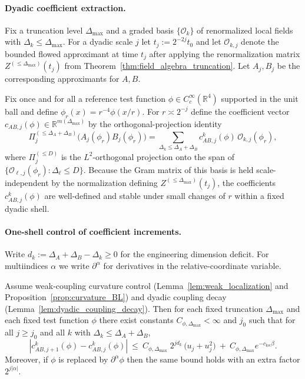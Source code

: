 \paragraph{Dyadic coefficient extraction.}
Fix a truncation level $\Delta_{\max}$ and a graded basis $\{\mathcal O_k\}$ of renormalized local fields with
$\Delta_k\le \Delta_{\max}$.
For a dyadic scale $j$ let $t_j:=2^{-2j}t_0$ and let $\mathcal O_{k,j}$ denote the bounded flowed approximant at time $t_j$
after applying the renormalization matrix $Z^{(\le \Delta_{\max})}(t_j)$ from
Theorem~\ref{thm:field_algebra_truncation}.
Let $A_j,B_j$ be the corresponding approximants for $A,B$.

Fix once and for all a reference test function $\phi\in C_c^\infty(\mathbb R^4)$ supported in the unit ball
and define $\phi_r(x)=r^{-4}\phi(x/r)$.
For $r\asymp 2^{-j}$ define the coefficient vector $c_{AB,j}(\phi)\in\mathbb R^{m(\Delta_{\max})}$ by the orthogonal-projection identity
\begin{equation}\label{eq:dyadic_ope_coeff_def}
\Pi^{(\le \Delta_A+\Delta_B)}_j\bigl(A_j(\phi_r)B_j(\phi_r)\bigr)
=\sum_{\Delta_k\le \Delta_A+\Delta_B} c_{AB,j}^k(\phi)\,\mathcal O_{k,j}(\phi_r),
\end{equation}
where $\Pi^{(\le D)}_j$ is the $L^2$-orthogonal projection onto the span of $\{\mathcal O_{\ell,j}(\phi_r):\Delta_\ell\le D\}$.
Because the Gram matrix of this basis is held scale-independent by the normalization defining $Z^{(\le \Delta_{\max})}(t_j)$,
the coefficients $c_{AB,j}^k(\phi)$ are well-defined and stable under small changes of $r$ within a fixed dyadic shell.

\paragraph{One-shell control of coefficient increments.}
Write $d_k:=\Delta_A+\Delta_B-\Delta_k\ge 0$ for the engineering dimension deficit.
For multiindices $\alpha$ we write $\partial^\alpha$ for derivatives in the relative-coordinate variable.

\begin{lemma}\label{lem:ope_shell_increment}
Assume weak-coupling curvature control (Lemma~\ref{lem:weak_localization} and Proposition~\ref{prop:curvature_BL})
and dyadic coupling decay (Lemma~\ref{lem:dyadic_coupling_decay}).
Then for each fixed truncation $\Delta_{\max}$ and each fixed test function $\phi$ there exist constants
$C_{\phi,\Delta_{\max}}<\infty$ and $j_0$ such that for all $j\ge j_0$ and all $k$ with $\Delta_k\le \Delta_A+\Delta_B$,
\begin{equation}\label{eq:ope_shell_increment_bound}
|c_{AB,j+1}^k(\phi)-c_{AB,j}^k(\phi)|
\ \le\ C_{\phi,\Delta_{\max}}\; 2^{j d_k}\,\bigl(u_j+u_j^2\bigr)\ +\ C_{\phi,\Delta_{\max}}e^{-c_{\mathrm{loc}}\beta}.
\end{equation}
Moreover, if $\phi$ is replaced by $\partial^\alpha\phi$ then the same bound holds with an extra factor $2^{j|\alpha|}$.
\end{lemma}

